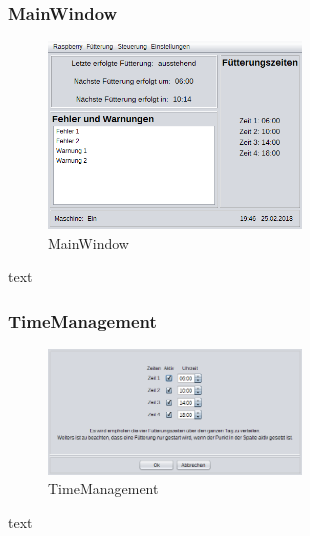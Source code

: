 \subsubsection{MainWindow}\label{subsubsec:MainWindow}
\begin{figure}
\vspace{-20pt}
  \begin{center}
    \includegraphics[width=0.60\textwidth]{Bilder/GUI/MainWindow}
  \end{center}
  \caption{MainWindow}
  \label{MainWindow}
  \vspace{-40pt}
\end{figure}
text

\newpage

\subsubsection{TimeManagement}
\begin{figure}
\vspace{-20pt}
  \begin{center}
    \includegraphics[width=0.60\textwidth]{Bilder/GUI/TimeManagement}
  \end{center}
  \caption{TimeManagement}
  \label{TimeManagement}
  \vspace{-40pt}
\end{figure}
text

